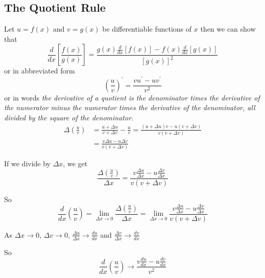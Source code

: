 \subsection{The Quotient Rule}
Let $u =f (x)$ and $v =g (x)$ be differentiable functions of $x$ then we can show that
\begin{equation*}\frac{d}{d x} \genfrac{[}{]}{}{}{f (x)}{g (x)} =\frac{g (x) \frac{d}{d x} \left [f (x)\right ] -f (x) \frac{d}{d x} \left [g (x)\right ]}{\left [g (x)\right ]^{2}}
\end{equation*}or in abbreviated form
\begin{equation*}\genfrac{(}{)}{}{}{u}{v}^{ \prime } =\frac{v u^{ \prime } -u v^{ \prime }}{v^{2}}
\end{equation*}or in words \textit{the derivative of a quotient is the denominator times the derivative of the numerator minus the numerator
times the derivative of the denominator, all divided by the square of the denominator.}
\begin{align*} \Delta \genfrac{(}{)}{}{}{u}{v} &  = \frac{u + \Delta u}{v + \Delta v} -\frac{u}{v} =\frac{\left (u + \Delta u\right ) v -u \left (v + \Delta v\right )}{v \left (v + \Delta v\right )} \\
 &  = \frac{v  \Delta u -u  \Delta v}{v \left (v + \Delta v\right )}\end{align*}

If we divide by $ \Delta x$, we get
\begin{equation*}\frac{ \Delta \genfrac{(}{)}{}{}{u}{v}}{ \Delta x} =\frac{v \frac{ \Delta u}{ \Delta x} -u \frac{ \Delta v}{ \Delta x}}{v \left (v + \Delta v\right )}
\end{equation*}

So
\begin{equation*}\frac{d}{d x} \genfrac{(}{)}{}{}{u}{v} =\underset{ \Delta x \rightarrow 0}{\lim }\frac{ \Delta \genfrac{(}{)}{}{}{u}{v}}{ \Delta x} =\underset{ \Delta x \rightarrow 0}{\lim }\frac{v \frac{ \Delta u}{ \Delta x} -u \frac{ \Delta v}{ \Delta x}}{v \left (v + \Delta v\right )}
\end{equation*}

As $ \Delta x \rightarrow 0$, $ \Delta v \rightarrow 0$, $\frac{ \Delta u}{ \Delta x} \rightarrow \frac{d u}{d x}$ and $\frac{ \Delta v}{ \Delta x} \rightarrow \frac{d v}{d x}$ 

So
\begin{equation*}\frac{d}{d x} \genfrac{(}{)}{}{}{u}{v} \rightarrow \frac{v \frac{d u}{d x} -u \frac{d v}{d x}}{v^{2}}
\end{equation*}

